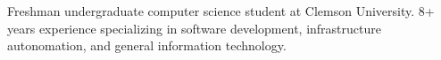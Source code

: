 

\begin{cvparagraph}

Freshman undergraduate computer science student at Clemson University. 8+ years experience specializing in software development, infrastructure autonomation, and general information technology.
\end{cvparagraph}
